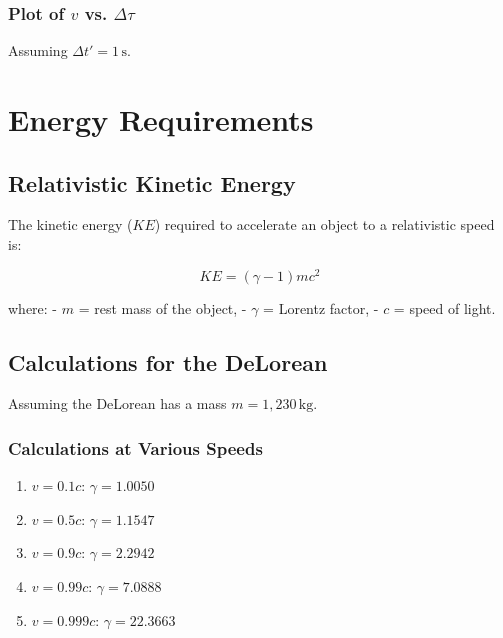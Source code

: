 \documentclass{article}
\begin{document}
\begin{multicols}{2}
\subsubsection*{Plot of \( v \) vs. \( \Delta \tau \)}

Assuming \( \Delta t' = 1\, \text{s} \).


\columnbreak

\section*{Energy Requirements}

\subsection*{Relativistic Kinetic Energy}

The kinetic energy (\( KE \)) required to accelerate an object to a relativistic speed is:

\[
KE = (\gamma - 1) m c^2
\]

where:
- \( m \) = rest mass of the object,
- \( \gamma \) = Lorentz factor,
- \( c \) = speed of light.

\subsection*{Calculations for the DeLorean}

Assuming the DeLorean has a mass \( m = 1,230\, \text{kg} \).

\subsubsection*{Calculations at Various Speeds}

\begin{enumerate}
    \item \( v = 0.1c \): \( \gamma = 1.0050 \)
    \item \( v = 0.5c \): \( \gamma = 1.1547 \)
    \item \( v = 0.9c \): \( \gamma = 2.2942 \)
    \item \( v = 0.99c \): \( \gamma = 7.0888 \)
    \item \( v = 0.999c \): \( \gamma = 22.3663 \)
\end{enumerate}


\end{multicols}
\end{document}
